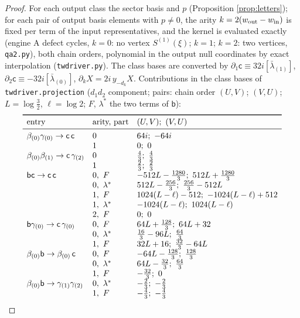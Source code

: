 \documentclass[11pt]{article}
\theoremstyle{definition}
\begin{document}
\begin{proof}
For each output class the sector basis and $p$ (Proposition \ref{prop:letters}); for each pair of output basis elements with $p\ne0$, the arity $k=2(w_{\rm out}-w_{\rm in})$ is fixed per term of the input representatives, and the kernel is evaluated exactly (engine A defect cycles, $k=0$: no vertex $S^{(1)}(\xi)$; $k=1$; $k=2$: two vertices, \texttt{qa2.py}), both chain orders, polynomial in the output null coordinates by exact interpolation (\texttt{twdriver.py}). The class bases are converted by $\partial_1\mathsf c\equiv32i[\bar\lambda_{(1)}]$, $\partial_2\mathsf c\equiv-32i[\bar\lambda_{(0)}]$, $\partial_kX=2i\,y_{-d_k}X$. Contributions in the class bases of \texttt{twdriver.projection} ($d_1d_2$ component; pairs: chain order $(U,V)$; $(V,U)$; $L=\log\tfrac32$, $\ell=\log2$; $F$, $\lambda^*$ the two terms of $\mathsf b$):
\[
\begin{array}{lll}
\toprule
\text{entry}&\text{arity, part}&(U,V);\ (V,U)\\\midrule
\beta_{(0)}\gamma_{(0)}\to\mathsf c\,\mathsf c&0&64i;\ -64i\\
&1&0;\ 0\\
\beta_{(0)}\beta_{(1)}\to\mathsf c\,\gamma_{(2)}&0&\tfrac43;\ \tfrac43\\
&1&\tfrac23;\ \tfrac23\\
\mathsf b\mathsf c\to\mathsf c\,\mathsf c&0,\ F&-512L-\tfrac{1280}3;\ 512L+\tfrac{1280}3\\
&0,\ \lambda^*&512L-\tfrac{256}3;\ \tfrac{256}3-512L\\
&1,\ F&1024(L-\ell)-512;\ -1024(L-\ell)+512\\
&1,\ \lambda^*&-1024(L-\ell);\ 1024(L-\ell)\\
&2,\ F&0;\ 0\\
\mathsf b\gamma_{(0)}\to\mathsf c\,\gamma_{(0)}&0,\ F&64L+\tfrac{128}3;\ 64L+32\\
&0,\ \lambda^*&\tfrac{16}3-96L;\ \tfrac{64}3\\
&1,\ F&32L+16;\ \tfrac{32}3-64L\\
\beta_{(0)}\mathsf b\to\beta_{(0)}\,\mathsf c&0,\ F&-64L-\tfrac{128}3;\ \tfrac{128}3\\
&0,\ \lambda^*&64L-\tfrac{32}3;\ \tfrac{64}3\\
&1,\ F&-\tfrac{32}3;\ 0\\
\beta_{(0)}\mathsf b\to\gamma_{(1)}\gamma_{(2)}&0,\ \lambda^*&-\tfrac23;\ -\tfrac23\\
&1,\ F&-\tfrac43;\ -\tfrac43\\

\end{array}\]
\end{proof}
\end{document}
